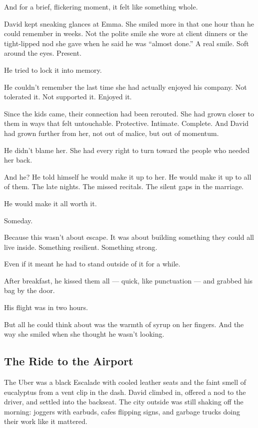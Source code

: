 And for a brief, flickering moment, it felt like something whole.

David kept sneaking glances at Emma. She smiled more in that one hour than he could remember in weeks. Not the 
polite smile she wore at client dinners or the tight-lipped nod she gave when he said he was “almost done.” 
A real smile. Soft around the eyes. Present.

He tried to lock it into memory.

He couldn’t remember the last time she had actually enjoyed his company. Not tolerated it. Not supported it. 
Enjoyed it.

Since the kids came, their connection had been rerouted. She had grown closer to them in ways that felt 
untouchable. Protective. Intimate. Complete. And David had grown further from her, not out of malice, 
but out of momentum.

He didn’t blame her. She had every right to turn toward the people who needed her back.

And he? He told himself he would make it up to her. He would make it up to all of them.
The late nights. The missed recitals. The silent gaps in the marriage.

He would make it all worth it.

Someday.

Because this wasn’t about escape. It was about building something they could all live inside.
Something resilient. Something strong.

Even if it meant he had to stand outside of it for a while.

After breakfast, he kissed them all --- quick, like punctuation --- and grabbed his bag by the door.

His flight was in two hours.

But all he could think about was the warmth of syrup on her fingers.
And the way she smiled when she thought he wasn’t looking.

\subsection{The Ride to the Airport}

The Uber was a black Escalade with cooled leather seats and the faint smell of eucalyptus from a vent 
clip in the dash. David climbed in, offered a nod to the driver, and settled into the backseat. The 
city outside was still shaking off the morning: joggers with earbuds, cafes flipping signs, and garbage 
trucks doing their work like it mattered.

